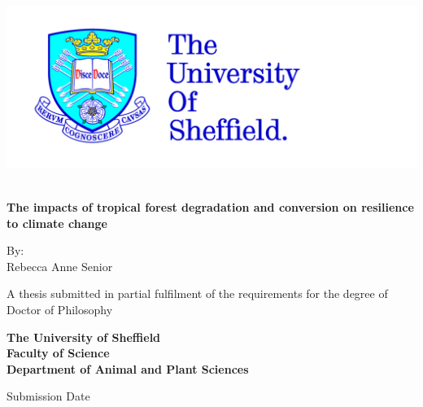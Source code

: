 \documentclass[12pt,a4paper,]{report}
\title{}
\author{}
\date{}
\theoremstyle{definition}
\theoremstyle{definition}
\theoremstyle{definition}
\theoremstyle{remark}
\begin{document}
\thispagestyle{empty}
\begin{center}
\includegraphics{logos/tuoslogo_cmyk_hi.jpg}
\vspace{1.5cm}
 {\Huge\bfseries \\The impacts of tropical forest degradation and conversion on resilience to climate change\par}
 \vspace{1.5cm}
 {\Large By:\\ Rebecca Anne Senior\par}
 \vspace{1.5cm}
 {A thesis submitted in partial fulfilment of the requirements for the degree of\\ Doctor of Philosophy\par}
 \vspace{2cm}\bfseries
 The University of Sheffield\\
 Faculty of Science\\
 Department of Animal and Plant Sciences\par
 \vfill
 {\large {\normalfont Submission Date\par}}
\end{center}

\setlength{\abovedisplayskip}{-5pt}
\setlength{\abovedisplayshortskip}{-5pt}


\nocite{gonzalez_del_pliego_unpublished, 
gonzalez-di_pierro_effects2011,
  goode_unpublished,
  goode_seed2009,
  ibanez_sharp2013,
  lebrija-trejos_environmental2011,
  negrete-yankelevich_successional2007,
  santos_interaccion2011,
  santos_insect2012,
  sonnleitner_microclimatic2009,
  wood_no2008,
  yashiro_effects2008,
  adachi_differences2006,
  hardwick_aboveground2016,
  hardwick_relationship2015,
  klein_predatorprey2002,
  wangluk_role2013,
  werner_n2o2006,
  holl_factors1999,
  liu_exotic2002,
  king_ants1998,
  badejo_response2004,
  campos_response2006,
  badejo_seasonal1990,
  furukawa_effect2005}

{
\setcounter{tocdepth}{1}
\tableofcontents
}
\listoftables
\listoffigures
\end{document}
